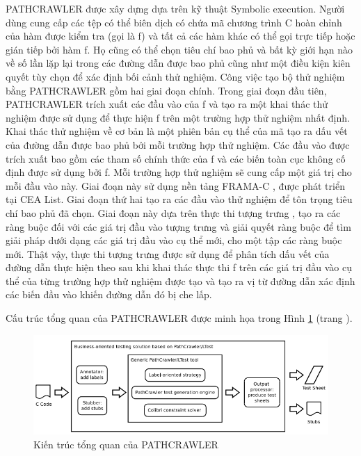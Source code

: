 \documentclass[12pt,a4paper]{article}
\begin{document}
\indent PATHCRAWLER được xây dựng dựa trên kỹ thuật Symbolic execution. Người dùng cung cấp các tệp có thể biên dịch có chứa mã chương trình C hoàn chỉnh của hàm được kiểm tra (gọi là f) và tất cả các hàm khác có thể gọi trực tiếp hoặc gián tiếp bởi hàm f. Họ cũng có thể chọn tiêu chí bao phủ và bất kỳ giới hạn nào về số lần lặp lại trong các đường dẫn được bao phủ cũng như một điều kiện kiên quyết tùy chọn để xác định bối cảnh thử nghiệm. Công việc tạo bộ thử nghiệm bằng PATHCRAWLER gồm hai giai đoạn chính. Trong giai đoạn đầu tiên, PATHCRAWLER trích xuất các đầu vào của f và tạo ra một khai thác thử nghiệm được sử dụng để thực hiện f trên một trường hợp thử nghiệm nhất định. Khai thác thử nghiệm về cơ bản là một phiên bản cụ thể của mã tạo ra dấu vết của đường dẫn được bao phủ bởi mỗi trường hợp thử nghiệm. Các đầu vào được trích xuất bao gồm các tham số chính thức của f và các biến toàn cục không cố định được sử dụng bởi f. Mỗi trường hợp thử nghiệm sẽ cung cấp một giá trị cho mỗi đầu vào này. Giai đoạn này sử dụng nền tảng FRAMA-C \cite{kirchner2015frama}, được phát triển tại CEA List. Giai đoạn thứ hai tạo ra các đầu vào thử nghiệm để tôn trọng tiêu chí bao phủ đã chọn.  Giai đoạn này dựa trên thực thi tượng trưng , tạo ra các ràng buộc đối với các giá trị đầu vào tượng trưng và giải quyết ràng buộc để tìm giải pháp dưới dạng các giá trị đầu vào cụ thể mới, cho một tập các ràng buộc mới. Thật vậy, thực thi tượng trưng được sử dụng để phân tích dấu vết của đường dẫn thực hiện theo sau khi khai thác thực thi f trên các giá trị đầu vào cụ thể của từng trường hợp thử nghiệm được tạo và tạo ra vị từ đường dẫn xác định các biến đầu vào khiến đường dẫn đó bị che lấp.

Cấu trúc tổng quan của PATHCRAWLER được minh họa trong Hình \ref{refhinh6} (trang \pageref{refhinh6}).

\begin{figure}[ht]
\begin{center}
\includegraphics[scale=0.7]{hinhanh/pathcrawler}
\end{center}
\caption{Kiến trúc tổng quan của PATHCRAWLER}
\label{refhinh6}
\end{figure}
\end{document}
